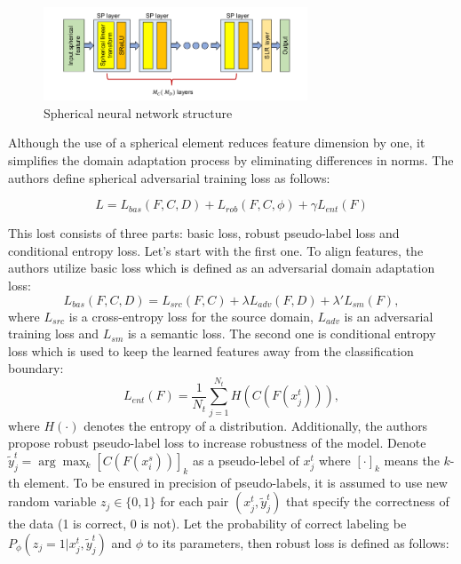 \begin{figure}[H]
    \centering
    \includegraphics[width=0.7\textwidth]{Figures/From articles/sphere_layers.png}
    \caption{Spherical neural network structure}
    \label{fig: sphere_layers}
\end{figure}

Although the use of a spherical element reduces feature dimension by one, it simplifies the domain adaptation process by eliminating differences in norms. The authors define spherical adversarial training loss as follows:

\begin{equation}
    L = L_{bas}(F, C, D) + L_{rob}(F, C, \phi) + \gamma L_{ent}(F)
\end{equation}

This lost consists of three parts: basic loss, robust pseudo-label loss and conditional entropy loss. Let's start with the first one. To align features, the authors utilize basic loss which is defined as an adversarial domain adaptation loss:
\begin{equation}
L_{bas}(F, C, D) = L_{src}(F, C) + \lambda L_{adv}(F, D) + \lambda' L_{sm}(F),
\end{equation}
where $L_{src}$ is a cross-entropy loss for the source domain, $L_{adv}$ is an adversarial training loss and $L_{sm}$ is a semantic loss. The second one is conditional entropy loss which is used to keep the learned features away from the classification boundary:
\begin{equation}
L_{ent}(F) = \dfrac{1}{N_t} \sum_{j=1}^{N_t} H(C(F(x_j^t))),
\end{equation}
where $H(\cdot)$ denotes the entropy of a distribution. Additionally, the authors propose robust pseudo-label loss to increase robustness of the model. Denote $\tilde{y}_j^t = \arg \max_k [C(F(x_i^s))]_k$ as a pseudo-lebel of $x_j^t$ where $[\cdot]_k$ means the $k$-th element. To be ensured in precision of pseudo-labels, it is assumed to use new random variable $z_j \in \{0, 1\}$ for each pair $(x_j^t, \tilde{y}_j^t)$ that specify the correctness of the data (1 is correct, 0 is not). Let the probability of correct labeling be $P_\phi (z_j = 1| x_j^t, \tilde{y}_j^t)$ and $\phi$ to its parameters, then robust loss is defined as follows:


